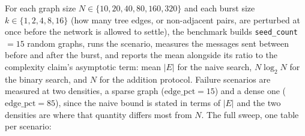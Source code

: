 For each graph size $N \in \{10, 20, 40, 80, 160, 320\}$ and each burst size $k \in \{1, 2,
4, 8, 16\}$ (how many tree edges, or non-adjacent pairs, are perturbed at once before the
network is allowed to settle), the benchmark builds \texttt{seed\_count} $= 15$ random
graphs, runs the scenario, measures the messages sent between before and after the burst,
and reports the mean alongside its ratio to the complexity claim's asymptotic term: mean
$|E|$ for the naive search, $N \log_2 N$ for the binary search, and $N$ for the addition
protocol. Failure scenarios are measured at two densities, a sparse graph
($\mathrm{edge\_pct} = 15$) and a dense one ($\mathrm{edge\_pct} = 85$), since the naive
bound is stated in terms of $|E|$ and the two densities are where that quantity differs
most from $N$.
The full sweep, one table per scenario:

